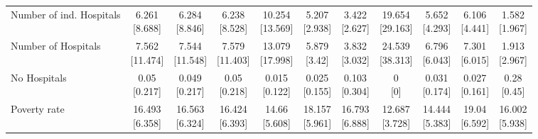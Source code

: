 \begin{tabular}[t]{lcccccccccc}
\addlinespace
Number of ind. Hospitals & \makecell[t]{6.261\\{[}8.688{]}} & \makecell[t]{6.284\\{[}8.846{]}} & \makecell[t]{6.238\\{[}8.528{]}} & \makecell[t]{10.254\\{[}13.569{]}} & \makecell[t]{5.207\\{[}2.938{]}} & \makecell[t]{3.422\\{[}2.627{]}} & \makecell[t]{19.654\\{[}29.163{]}} & \makecell[t]{5.652\\{[}4.293{]}} & \makecell[t]{6.106\\{[}4.441{]}} & \makecell[t]{1.582\\{[}1.967{]}}\\
\addlinespace
Number of Hospitals & \makecell[t]{7.562\\{[}11.474{]}} & \makecell[t]{7.544\\{[}11.548{]}} & \makecell[t]{7.579\\{[}11.403{]}} & \makecell[t]{13.079\\{[}17.998{]}} & \makecell[t]{5.879\\{[}3.42{]}} & \makecell[t]{3.832\\{[}3.032{]}} & \makecell[t]{24.539\\{[}38.313{]}} & \makecell[t]{6.796\\{[}6.043{]}} & \makecell[t]{7.301\\{[}6.015{]}} & \makecell[t]{1.913\\{[}2.967{]}}\\
\addlinespace
No Hospitals & \makecell[t]{0.05\\{[}0.217{]}} & \makecell[t]{0.049\\{[}0.217{]}} & \makecell[t]{0.05\\{[}0.218{]}} & \makecell[t]{0.015\\{[}0.122{]}} & \makecell[t]{0.025\\{[}0.155{]}} & \makecell[t]{0.103\\{[}0.304{]}} & \makecell[t]{0\\{[}0{]}} & \makecell[t]{0.031\\{[}0.174{]}} & \makecell[t]{0.027\\{[}0.161{]}} & \makecell[t]{0.28\\{[}0.45{]}}\\
\addlinespace
Poverty rate & \makecell[t]{16.493\\{[}6.358{]}} & \makecell[t]{16.563\\{[}6.324{]}} & \makecell[t]{16.424\\{[}6.393{]}} & \makecell[t]{14.66\\{[}5.608{]}} & \makecell[t]{18.157\\{[}5.961{]}} & \makecell[t]{16.793\\{[}6.888{]}} & \makecell[t]{12.687\\{[}3.728{]}} & \makecell[t]{14.444\\{[}5.383{]}} & \makecell[t]{19.04\\{[}6.592{]}} & \makecell[t]{16.002\\{[}5.938{]}}\\

\end{tabular}
